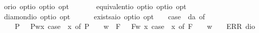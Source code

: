 \begin{isabellebody}
\ or{\isacharcolon}{\isacharcolon}{\isachardoublequoteopen}io\ opt{\isasymRightarrow}io\ opt{\isasymRightarrow}io\ opt{\isachardoublequoteclose}{\isacharparenleft}\ {\isachardoublequoteopen}\isactrlbold {\isasymor}{\isachardoublequoteclose}\ {}{}{\isacharparenright}\ \ {\isachardoublequoteopen}{\isasymphi}\isactrlbold {\isasymor}{\isasympsi}\ {\isasymequiv}\ \isactrlbold {\isasymnot}{\isasymphi}\isactrlbold {\isasymrightarrow}{\isasympsi}{\isachardoublequoteclose}\isanewline
{}\isamarkupfalse%
\ equivalent{\isacharcolon}{\isacharcolon}{\isachardoublequoteopen}io\ opt{\isasymRightarrow}io\ opt{\isasymRightarrow}io\ opt{\isachardoublequoteclose}{\isacharparenleft}\ {\isachardoublequoteopen}\isactrlbold {\isasymequiv}{\isachardoublequoteclose}\ {}{}{\isacharparenright}\ \ {\isachardoublequoteopen}{\isasymphi}\isactrlbold {\isasymequiv}{\isasympsi}\ {\isasymequiv}\ {\isacharparenleft}{\isasymphi}\isactrlbold {\isasymrightarrow}{\isasympsi}{\isacharparenright}\isactrlbold {\isasymand}{\isacharparenleft}{\isasympsi}\isactrlbold {\isasymrightarrow}{\isasymphi}{\isacharparenright}{\isachardoublequoteclose}\isanewline
{}\isamarkupfalse%
\ diamond{\isacharcolon}{\isacharcolon}{\isachardoublequoteopen}io\ opt{\isasymRightarrow}io\ opt{\isachardoublequoteclose}{\isacharparenleft}{\isachardoublequoteopen}\isactrlbold {\isasymdiamond}{\isachardoublequoteclose}{\isacharparenright}\ \ {\isachardoublequoteopen}\isactrlbold {\isasymdiamond}{\isasymphi}\ {\isasymequiv}\ \isactrlbold {\isasymnot}{\isacharparenleft}\isactrlbold {\isasymbox}{\isacharparenleft}\isactrlbold {\isasymnot}\ {\isasymphi}{\isacharparenright}{\isacharparenright}{\isachardoublequoteclose}\isanewline
{}\isamarkupfalse%
\ exists{\isacharcolon}{\isacharcolon}{\isachardoublequoteopen}{\isacharparenleft}{\isacharprime}a{\isasymRightarrow}io\ opt{\isacharparenright}{\isasymRightarrow}io\ opt{\isachardoublequoteclose}{\isacharparenleft}{\isachardoublequoteopen}\isactrlbold {\isasymexists}{\isachardoublequoteclose}{\isacharparenright}\ \ {\isachardoublequoteopen}\isactrlbold {\isasymexists}{\isasymPhi}\ {\isasymequiv}\ case\ {\isacharparenleft}{\isasymPhi}\ da{\isacharparenright}\ of\isanewline
\ \ \ \ P\ {\isasymphi}\ {\isasymRightarrow}\ P{\isacharparenleft}{\isasymlambda}w{\isachardot}{\isasymexists}x{\isachardot}\ case\ {\isacharparenleft}{\isasymPhi}\ x{\isacharparenright}\ of\ P\ {\isasympsi}\ {\isasymRightarrow}\ {\isasympsi}\ w{\isacharparenright}\ {\isacharbar}\ F\ {\isasymphi}\ {\isasymRightarrow}\ F{\isacharparenleft}{\isasymlambda}w{\isachardot}\ {\isasymexists}x{\isachardot}\ case\ {\isacharparenleft}{\isasymPhi}\ x{\isacharparenright}\ of\ F\ {\isasympsi}\ {\isasymRightarrow}\ {\isasympsi}\ w{\isacharparenright}\ {\isacharbar}\ {\isacharunderscore}\ {\isasymRightarrow}\ ERR\ dio{\isachardoublequoteclose}\ \isanewline

\end{isabellebody}
